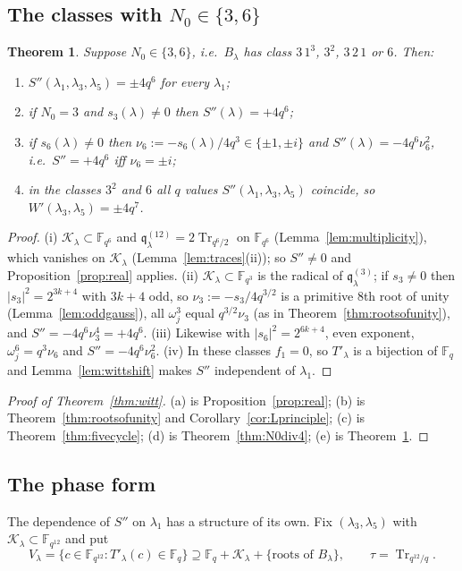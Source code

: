 ﻿\documentclass[12pt,a4paper]{amsart}
\newtheorem{theorem}{Theorem}[section]
\theoremstyle{definition}
\newcommand{\F}{\mathbb{F}}
\newcommand{\Tr}{\operatorname{Tr}}
\newcommand{\Kk}{\mathcal{K}}
\newcommand{\qq}{\mathfrak{q}}
\newcommand{\Spp}{S''}
\begin{document}
\subsection{The classes with \texorpdfstring{$N_0\in\{3,6\}$}{N0 in \{3,6\}}}
\begin{theorem}\label{thm:N0div6}
Suppose $N_0\in\{3,6\}$, i.e.\ $B_\lambda$ has class $3\,1^3$, $3^2$, $3\,2\,1$ or $6$. Then:
\begin{enumerate}[label=\textup{(\roman*)},leftmargin=2em]
\item $\Spp(\lambda_1,\lambda_3,\lambda_5)=\pm4q^6$ for every $\lambda_1$;
\item if $N_0=3$ and $s_3(\lambda)\ne0$ then $\Spp(\lambda)=+4q^6$;
\item if $s_6(\lambda)\ne0$ then $\nu_6:=-s_6(\lambda)/4q^3\in\{\pm1,\pm i\}$ and $\Spp(\lambda)=-4q^6\nu_6^2$, i.e.\ $\Spp=+4q^6$ iff $\nu_6=\pm i$;
\item in the classes $3^2$ and $6$ all $q$ values $\Spp(\lambda_1,\lambda_3,\lambda_5)$ coincide, so $W'(\lambda_3,\lambda_5)=\pm4q^7$.
\end{enumerate}
\end{theorem}
\begin{proof}
(i) $\Kk_\lambda\subset\F_{q^6}$ and $\qq^{(12)}_\lambda=2\Tr_{q^6/2}$ on $\F_{q^6}$ (Lemma~\ref{lem:multiplicity}), which vanishes on $\Kk_\lambda$ (Lemma~\ref{lem:traces}(ii)); so $\Spp\ne0$ and Proposition~\ref{prop:real} applies. (ii) $\Kk_\lambda\subset\F_{q^3}$ is the radical of $\qq^{(3)}_\lambda$; if $s_3\ne0$ then $|s_3|^2=2^{3k+4}$ with $3k+4$ odd, so $\nu_3:=-s_3/4q^{3/2}$ is a primitive $8$th root of unity (Lemma~\ref{lem:oddgauss}), all $\omega_j^3$ equal $q^{3/2}\nu_3$ (as in Theorem~\ref{thm:rootsofunity}), and $\Spp=-4q^6\nu_3^4=+4q^6$. (iii) Likewise with $|s_6|^2=2^{6k+4}$, even exponent, $\omega_j^6=q^3\nu_6$ and $\Spp=-4q^6\nu_6^2$. (iv) In these classes $f_1=0$, so $T'_\lambda$ is a bijection of $\F_q$ and Lemma~\ref{lem:wittshift} makes $\Spp$ independent of $\lambda_1$.
\end{proof}

\begin{proof}[Proof of Theorem~\ref{thm:witt}]
(a) is Proposition~\ref{prop:real}; (b) is Theorem~\ref{thm:rootsofunity} and Corollary~\ref{cor:Lprinciple}; (c) is Theorem~\ref{thm:fivecycle}; (d) is Theorem~\ref{thm:N0div4}; (e) is Theorem~\ref{thm:N0div6}.
\end{proof}

\subsection{The phase form}\label{subsec:phase}
The dependence of $\Spp$ on $\lambda_1$ has a structure of its own. Fix $(\lambda_3,\lambda_5)$ with $\Kk_\lambda\subset\F_{q^{12}}$ and put
\[
V_\lambda=\{c\in\F_{q^{12}}:T'_\lambda(c)\in\F_q\}\supseteq\F_q+\Kk_\lambda+\{\text{roots of }B_\lambda\},\qquad \tau=\Tr_{q^{12}/q}.
\]
\end{document}
